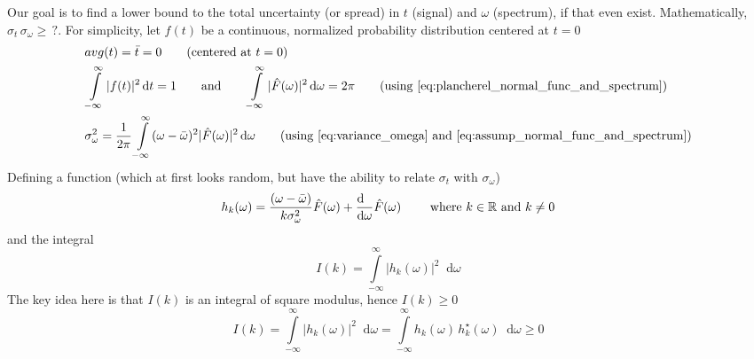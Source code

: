 \documentclass[11pt, a4paper]{article}
\newcommand{\eqrefnp}[1]{\textup{\ref{#1}}}  %
\newcommand{\variance}[1]{\sigma_{#1}^{2}}
\newcommand{\stdev}[1]{\sigma_{#1}}
\newcommand{\diff}{\mathop{}\!\mathrm{d}}
\newcommand{\dt}{\diff t}
\newcommand{\domega}{\diff \omega}
\newcommand{\derv}[1]{\frac{\diff \hfill}{\diff #1}}	%
\newcommand{\dint}[2]{\int \limits_{#1}^{#2}}  %
\newcommand{\intinfty}{\dint{-\infty}{\infty}}	%
\begin{document}
	\vspace{4pt}
	Our goal is to find a lower bound to the total uncertainty (or spread) in $t$ (signal) and $\omega$ (spectrum), if that even exist. Mathematically, $\stdev{t}\, \stdev{\omega} \geq \, ?$. For simplicity, let $f(t)$ be a continuous, normalized probability distribution centered at $t=0$
	\begin{subequations}
		\begin{align}
			& avg(t) = \bar{t} = 0 \qquad \text{(centered at $t = 0$)} \label{eq:assump_avg_t_0} \\
			& \intinfty |f(t)|^{2} \dt = 1 \qquad \text{and} \qquad \intinfty |\hat{F}(\omega)|^{2} \domega = 2\pi \qquad \text{(using \eqrefnp{eq:plancherel_normal_func_and_spectrum})} \label{eq:assump_normal_func_and_spectrum} \\
			& \variance{\omega} = \frac{1}{2\pi} \intinfty (\omega - \bar{\omega})^{2} |\hat{F}(\omega)|^{2} \domega  \qquad \text{(using \eqrefnp{eq:variance_omega} and \eqrefnp{eq:assump_normal_func_and_spectrum})} \label{eq:assump_variance_omega}
		\end{align}
	\end{subequations}
	Defining a function (which at first looks random, but have the ability to relate $\stdev{t}$ with $\stdev{\omega}$)\cite{dubey2021fourieruncertainity}
	\begin{equation}\label{eq:uncertainity_main_functionl}
		h_{k}(\omega) = \frac{(\omega - \bar{\omega})}{k \variance{\omega}} \hat{F}(\omega) + \derv{\omega}\hat{F}(\omega) \qquad \text{ where } k \in \mathbb{R} \text{ and } k \neq 0
	\end{equation}
	and the integral 
	\begin{equation}\label{eq:uncertainity_main_integral}
		I(k) = \intinfty |h_{k}(\omega)|^2 \domega
	\end{equation}
	The key idea here is that $I(k)$ is an integral of square modulus, hence $I(k) \geq 0$
	\begin{equation}\label{eq:uncertainity_main_integral_geq_0}
		I(k) = \intinfty |h_{k}(\omega)|^2 \domega = \intinfty h_{k}(\omega) \, h_{k}^{\star}(\omega) \domega \geq 0
	\end{equation}
\end{document}
